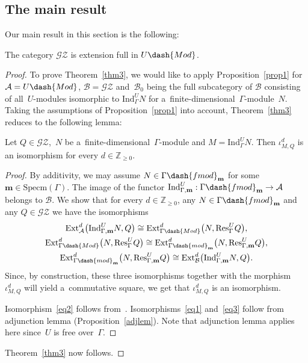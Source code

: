 \subsection{The main result}%

Our main result in this section is the following:

\begin{theorem}
\label{thm3}
The category $\mathscr{G}\mathscr{Z}$ is extension full in $U\dash{Mod}$.
\end{theorem}

\begin{proof}
To prove Theorem~\ref{thm3}, we would like to apply Proposition~\ref{prop1} for $\mathcal{A}=U\dash{Mod}$,
$\mathcal{B}=\mathscr{G}\mathscr{Z}$ and~$\mathcal{B}_0$ being the full subcategory of $\mathcal{B}$ consisting of
all~$U$-modules isomorphic to $\mathrm{Ind}_{\Gamma}^U N$ for a~f\/inite-dimensional~$\Gamma$-module~$N$.
Taking the assumptions of Proposition~\ref{prop1} into account, Theorem~\ref{thm3} reduces to the following lemma:

\begin{lemma}
Let $Q\in\mathscr{G}\mathscr{Z}$,~$N$ be a~finite-dimensional~$\Gamma$-module and $M=\mathrm{Ind}_{\Gamma}^U N$.
Then $\iota^d_{M,Q}$ is an isomorphism for every $d\in\mathbb{Z}_{\geq 0}$.
\end{lemma}

\begin{proof}
By additivity, we may assume $N\in \Gamma\dash{fmod}_{\mathbf{m}}$ for some $\mathbf{m}\in\mathrm{Specm}(\Gamma)$.
The image of the functor $\mathrm{Ind}_{\Gamma,\mathbf{m}}^U:\Gamma\dash{fmod}_{\mathbf{m}}\to \mathcal{A}$ belongs to
$\mathcal{B}$.
We show that for every $d\in\mathbb{Z}_{\geq 0}$, any $N\in \Gamma\dash{fmod}_{\mathbf{m}}$ and any
$Q\in\mathscr{G}\mathscr{Z}$ we have the isomorphisms
\begin{gather}
\label{eq1}
\mathrm{Ext}^d_{\mathcal{A}}\big(\mathrm{Ind}_{\Gamma,\mathbf{m}}^U N, Q\big)  \cong
\mathrm{Ext}^d_{\Gamma\dash{Mod}}\big(N,\mathrm{Res}_{\Gamma}^U Q\big),
\\
\label{eq2}
\mathrm{Ext}^d_{\Gamma\dash{Mod}}\big(N,\mathrm{Res}_{\Gamma}^U Q\big)  \cong
\mathrm{Ext}^d_{\Gamma\dash{mod}_{\mathbf{m}}}\big(N,\mathrm{Res}_{\Gamma,\mathbf{m}}^U Q\big),
\\
\label{eq3}
\mathrm{Ext}^d_{\Gamma\dash{mod}_{\mathbf{m}}}\big(N,\mathrm{Res}_{\Gamma,\mathbf{m}}^U Q\big)  \cong
\mathrm{Ext}^d_{\mathcal{B}}\big(\mathrm{Ind}_{\Gamma,\mathbf{m}}^U N, Q\big).
\end{gather}
Since, by construction, these three isomorphisms together with the morphism $\iota^d_{M,Q}$ will yield a~commutative
square, we get that $\iota^d_{M,Q}$ is an isomorphism.

Isomorphism~\eqref{eq2} follows from~\cite[Lemma~17]{CoMa}.
Isomorphisms~\eqref{eq1} and~\eqref{eq3} follow from adjunction lemma (Proposition~\ref{adjlem}).
Note that adjunction lemma applies here since~$U$ is free over~$\Gamma$.
\end{proof}

Theorem~\ref{thm3} now follows.
\end{proof}
